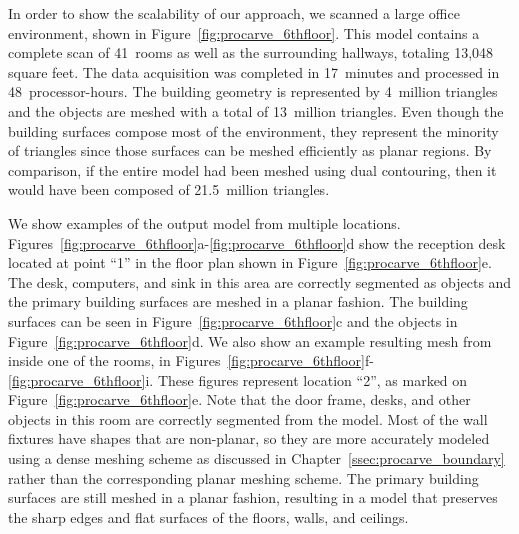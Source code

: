 \documentclass[12pt,onecolumn,oneside]{book}
\begin{document}
In order to show the scalability of our approach, we scanned a large office environment, shown in Figure~\ref{fig:procarve_6thfloor}.  This model contains a complete scan of 41~rooms as well as the surrounding hallways, totaling 13,048 square feet.  The data acquisition was completed in 17~minutes and processed in 48~processor-hours.  The building geometry is represented by 4~million triangles and the objects are meshed with a total of 13~million triangles.  Even though the building surfaces compose most of the environment, they represent the minority of triangles since those surfaces can be meshed efficiently as planar regions.  By comparison, if the entire model had been meshed using dual contouring, then it would have been composed of 21.5~million triangles.

We show examples of the output model from multiple locations.  Figures~\ref{fig:procarve_6thfloor}a-\ref{fig:procarve_6thfloor}d show the reception desk located at point ``1'' in the floor plan shown in Figure~\ref{fig:procarve_6thfloor}e.  The desk, computers, and sink in this area are correctly segmented as objects and the primary building surfaces are meshed in a planar fashion.  The building surfaces can be seen in Figure~\ref{fig:procarve_6thfloor}c and the objects in Figure~\ref{fig:procarve_6thfloor}d.  We also show an example resulting mesh from inside one of the rooms, in Figures~\ref{fig:procarve_6thfloor}f-\ref{fig:procarve_6thfloor}i.  These figures represent location ``2'', as marked on Figure~\ref{fig:procarve_6thfloor}e.  Note that the door frame, desks, and other objects in this room are correctly segmented from the model.  Most of the wall fixtures have shapes that are non-planar, so they are more accurately modeled using a dense meshing scheme as discussed in Chapter~\ref{ssec:procarve_boundary} rather than the corresponding planar meshing scheme.  The primary building surfaces are still meshed in a planar fashion, resulting in a model that preserves the sharp edges and flat surfaces of the floors, walls, and ceilings.
\end{document}
